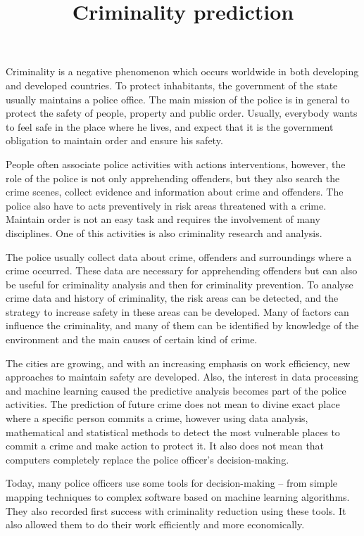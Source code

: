 \documentclass[thesis=M,english]{FITthesis}[2012/10/20]
\title{Criminality prediction}
\begin{document}
\begin{introduction}

Criminality is a negative phenomenon which occurs worldwide in both developing and developed countries. To protect inhabitants, the government of the state usually maintains a police office. The main mission of the police is in general to protect the safety of people, property and public order. Usually, everybody wants to feel safe in the place where he lives, and expect that it is the government obligation to maintain order and ensure his safety.

People often associate police activities with actions interventions, however, the role of the police is not only apprehending offenders, but they also search the crime scenes, collect evidence and information about crime and offenders. The police also have to acts preventively in risk areas threatened with a crime. Maintain order is not an easy task and requires the involvement of many disciplines. One of this activities is also criminality research and analysis.  

The police usually collect data about crime, offenders and surroundings where a crime occurred. These data are necessary for apprehending offenders but can also be useful for criminality analysis and then for criminality prevention. To analyse crime data and history of criminality, the risk areas can be detected, and the strategy to increase safety in these areas can be developed. Many of factors can influence the criminality, and many of them can be identified by knowledge of the environment and the main causes of certain kind of crime.

The cities are growing, and with an increasing emphasis on work efficiency, new approaches to maintain safety are developed. Also, the interest in data processing and machine learning caused the predictive analysis becomes part of the police activities. The prediction of future crime does not mean to divine exact place where a specific person commits a crime, however using data analysis, mathematical and statistical methods to detect the most vulnerable places to commit a crime and make action to protect it. It also does not mean that computers completely replace the police officer's decision-making. 

Today, many police officers use some tools for decision-making -- from simple mapping techniques to complex software based on machine learning algorithms. They also recorded first success with criminality reduction using these tools. It also allowed them to do their work efficiently and more economically.


\end{introduction}
\end{document}

